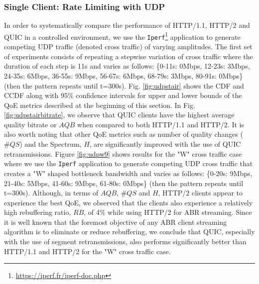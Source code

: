 \subsubsection{Single Client: Rate Limiting with UDP}
\label{subsubsec:single_udp}
In order to systematically compare the performance of HTTP/1.1, HTTP/2 and QUIC in a controlled environment, we use the \texttt{Iperf}\footnote{\url{https://iperf.fr/iperf-doc.php}} application to generate competing UDP traffic (denoted cross traffic) of varying amplitudes. The first set of experiments consists of repeating a stepwise variation of cross traffic where the duration of each step is 11s and varies as follows: \{0-11s: 0Mbps, 12-23s: 3Mbps, 24-35s: 6Mbps, 36-55s: 9Mbps, 56-67s: 6Mbps, 68-79s: 3Mbps, 80-91s: 0Mbps\} (then the pattern repeats until t=300s). Fig. \ref{fig:udpstair} shows the CDF and CCDF along with 95\% confidence intervals for upper and lower bounds of the QoE metrics described at the beginning of this section. In Fig. \ref{fig:udpstairbitrate}, we observe that QUIC clients have the highest average quality bitrate or $AQB$ when compared to both HTTP/1.1 and HTTP/2. It is also worth noting that other QoE metrics such as number of quality changes ($\#QS$) and the Spectrum, $H$, are significantly improved with the use of QUIC retransmissions. Figure \ref{fig:udpw9} shows results for the "W" cross traffic case where we use the \texttt{Iperf} application to generate competing UDP cross traffic that creates a "W" shaped bottleneck bandwidth and varies as follows: \{0-20s: 9Mbps, 21-40s: 5Mbps, 41-60s: 9Mbps, 61-80s: 0Mbps\} (then the pattern repeats until t=300s). Although, in terms of $AQB$, $\#QS$ and $H$, HTTP/2 clients appear to experience the best QoE, we observed that the clients also experience a relatively high rebuffering ratio, $RB$, of 4\% while using HTTP/2 for ABR streaming. Since it is well known that the foremost objective of any ABR client streaming algorithm is to eliminate or reduce rebuffering, we conclude that QUIC, especially with the use of segment retransmissions, also performs significantly better than HTTP/1.1 and HTTP/2 for the "W" cross traffic case. 
